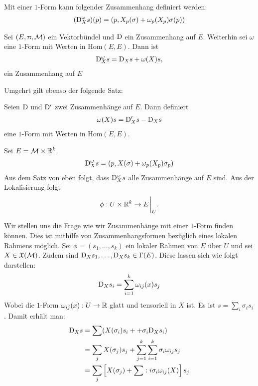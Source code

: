 \begin{defs}
Mit einer $1$-Form kann folgender Zusammenhang definiert werden:
\begin{align}
(\mathrm{D}^\omega_X s)(p) = (p, X_p(\sigma) + \omega_p(X_p) \sigma(p))
\end{align}
\end{defs}

\begin{satz}
\label{satz:zusammenhangausform}
Sei $(E, \uppi, \mathcal{M})$ ein Vektorbündel und $\mathrm{D}$ ein Zusammenhang auf $E$.
Weiterhin sei $\omega$ eine $1$-Form mit Werten in $\mathrm{Hom}(E, E)$.
Dann ist 
\begin{align}
\mathrm{D}^\omega_X s = \mathrm{D}_X s + \omega(X) s,
\end{align}
ein Zusammenhang auf $E$
\end{satz}
Umgehrt gilt ebenso der folgende Satz:
\begin{satz}
Seien $\mathrm{D}$ und $\mathrm{D}'$ zwei Zusammenhänge auf $E$.
Dann definiert 
\begin{align}
\omega(X) s = \mathrm{D}'_X s - \mathrm{D}_X s
\end{align}
eine $1$-Form mit Werten in $\mathrm{Hom}(E, E)$.
\end{satz}
\begin{bsp}
Sei $E = \mathcal{M} \times \mathbb{R}^k$. 
\begin{align}
\mathrm{D}^\omega_X s = (p, X(\sigma) + \omega_p (X_p)\sigma_p)
\end{align}
Aus dem Satz von eben folgt, dass $\mathrm{D}^\omega_X s$ alle Zusammenhänge auf $E$ sind.
Aus der Lokalisierung folgt
\begin{align}
\phi : U \times \R^k \to E\eval_U.
\end{align}
\end{bsp}
Wir stellen uns die Frage wie wir Zusammenhänge mit einer $1$-Form finden können.
Dies ist mithilfe von Zusammenhangsformen bezüglich eines lokalen Rahmens möglich.
Sei $\phi = (s_1, \dots, s_k)$ ein lokaler Rahmen von $E$ über $U$ und sei $X \in \mathfrak{X}(\mathcal{M})$.
Zudem sind $\mathrm{D}_X s_1, \dots, \mathrm{D}_X s_k \in \Gamma(E)$.
Diese lassen sich wie folgt darstellen:
\begin{align}
\mathrm{D}_X s_i = \sum_{i=1}^k \omega_{ij}(x) s_j
\end{align}
Wobei die $1$-Form $\omega_{ij}(x): U \to \mathbb{R}$ glatt und tensoriell in $X$ ist.
Es ist $s = \sum_i \sigma_i s_i$. 
Damit erhält man:
\begin{align}
\mathrm{D}_X s &= \sum (X(\sigma_i)s_i + + \sigma_i \mathrm{D}_X s_i)\\
&= \sum_j X(\sigma_j)s_j + \sum_{j=1}^k \sum_{i=1}^k \sigma_i \omega_{ij} s_j\\
&= \sum_j \left[ X(\sigma_j) + \sum:i \sigma_i \omega_{ij}(X) \right] s_j
\end{align}


